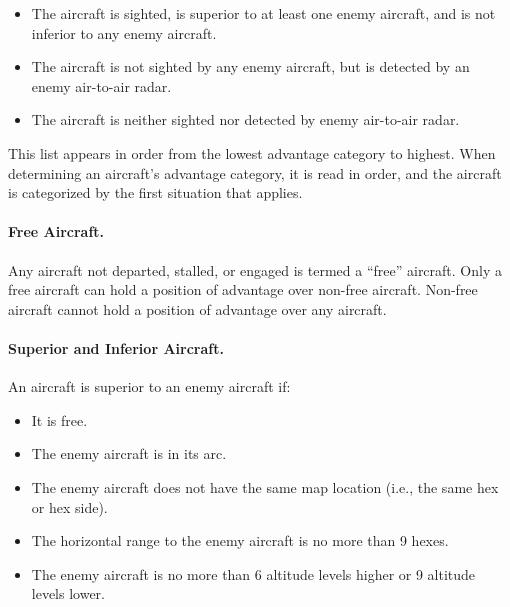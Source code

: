 {\begin{itemize}
    \item{} 
    The aircraft is sighted, is superior to at least one enemy aircraft, and is not inferior to any enemy aircraft.

    \item{} The aircraft is not sighted by any enemy aircraft, but is detected by an enemy air-to-air radar.

    \item{} The aircraft is neither sighted nor detected by enemy air-to-air radar.

\end{itemize}

This list appears in order from the lowest advantage category to highest. When determining an aircraft’s advantage category, it is read in order, and the aircraft is categorized by the first situation that applies. 

\paragraph{Free Aircraft.} Any aircraft not departed, stalled, or engaged is termed a “free” aircraft. Only a free aircraft can hold a position of advantage over non-free aircraft. Non-free aircraft cannot hold a position of advantage over any aircraft.


\paragraph{Superior and Inferior Aircraft.} An aircraft is superior to an enemy aircraft if:
\begin{itemize}
    \item It is free.
    \item The enemy aircraft is in its   arc.
    \item The enemy aircraft does not have the same map location (i.e., the same hex or hex side).
    \item The horizontal range to the enemy aircraft is no more than 9 hexes.
    \item The enemy aircraft is no more than 6 altitude levels higher or 9 altitude levels lower.
\end{itemize}

}
